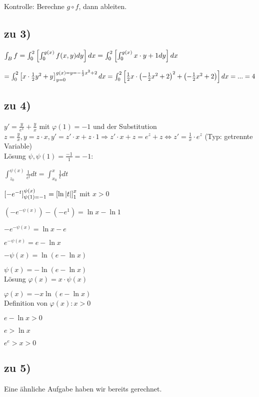 Kontrolle: Berechne $ g\circ f$, dann ableiten. 

\subsection{zu 3)}
$
\int_{B} f
= \int_{0}^{2}  \left[  \int_{0}^{g(x)} f(x,y) dy \right]  dx 
= \int_{0}^{2}  \left[  \int_{0}^{g(x)} x\cdot y + 1 dy \right]  dx
$

$
= \int_{0}^{2}  \left[  x\cdot \frac{1}{2} y^2 + y \right] _{y=0}^{g(x)=y=-\frac{1}{2} x^2 + 2} dx  
= \int_{0}^{2}  \left[ \frac{1}{2} x \cdot  \left( -\frac{1}{2} x^2 + 2 \right) ^2 +  \left( -\frac{1}{2} x^2 + 2 \right)   \right]  dx
= ...
= 4
$

\subsection{zu 4)}
$ y' = \frac{y}{e^x} + \frac{y}{x} $ mit $\varphi(1) = -1$ und der Substitution 
$ z = \frac{y}{x},  y=z\cdot x, y' = z' \cdot x + z \cdot 1 \Rightarrow z' \cdot x + z = e^z + z \Leftrightarrow z' = \frac{1}{x} \cdot e^z$ (Typ: getrennte Variable)\\

Lösung $\psi, \psi(1) = \frac{-1}{1}=-1$:

$ \int_{z_0}^{\psi(x)} \frac{1}{e^t} dt = \int_{x_0}^{x} \frac{1}{t} dt$ 

$  \left[ - e^{-t} \right] _{\psi(1) = -1}^{\psi(x)} =  \left[ \ln  \left\vert t \right\vert  \right] _1^x $ mit $x>0$

$ (-e^{-\psi(x)}) - (-e^1) = \ln x - \ln 1 $ 

$ -e^{-\psi(x)} = \ln x - e $ 

$ e^{-\psi(x)} = e - \ln x $

$-\psi(x) = \ln (e- \ln x)$

$\psi(x) = - \ln (e- \ln x)$\\

Lösung $\varphi(x) = x\cdot \psi(x) $

$\varphi(x) = - x \ln(e - \ln x)$\\

Definition von $\varphi(x) : x > 0$

$e - \ln x > 0 $

$e > \ln x$

\underline{$ e^e > x > 0 $}

\subsection{zu 5)}
Eine ähnliche Aufgabe haben wir bereits gerechnet. 
